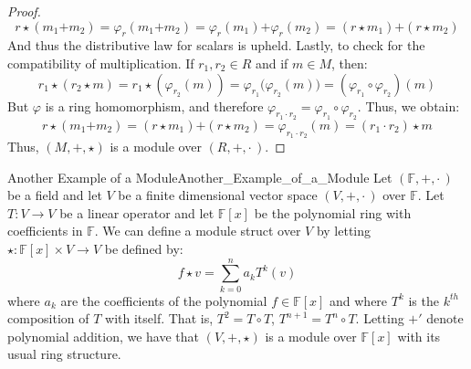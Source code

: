 \begin{proof}
\begin{equation}
            r\star(m_{1}\boldsymbol{+}m_{2})
            =\varphi_{r}(m_{1}\boldsymbol{+}m_{2})
            =\varphi_{r}(m_{1})\boldsymbol{+}\varphi_{r}(m_{2})
            =(r\star{m}_{1})\boldsymbol{+}(r\star{m}_{2})
        \end{equation}
        And thus the distributive law for scalars is upheld. Lastly, to check
        for the compatibility of multiplication. If $r_{1},r_{2}\in{R}$ and if
        $m\in{M}$, then:
        \begin{equation}
            r_{1}\star(r_{2}\star{m})
            =r_{1}\star(\varphi_{r_{2}}(m))
            =\varphi_{r_{1}}\big(\varphi_{r_{2}}(m)\big)
            =(\varphi_{r_{1}}\circ\varphi_{r_{2}})(m)
        \end{equation}
        But $\varphi$ is a ring homomorphism, and therefore
        $\varphi_{r_{1}\cdot{r_{2}}}=\varphi_{r_{1}}\circ\varphi_{r_{2}}$.
        Thus, we obtain:
        \begin{equation}
            r\star(m_{1}\boldsymbol{+}m_{2})
            =(r\star{m}_{1})\boldsymbol{+}(r\star{m}_{2})
            =\varphi_{r_{1}\cdot{r_{2}}}(m)
            =(r_{1}\cdot{r}_{2})\star{m}
        \end{equation}
        Thus, $(M,\boldsymbol{+},\star)$ is a module over $(R,+,\cdot\,)$.
    \end{proof}
    \begin{lexample}{Another Example of a Module}{Another_Example_of_a_Module}
        Let $(\mathbb{F},+,\cdot\,)$ be a field and let $V$ be a finite
        dimensional vector space $(V,\boldsymbol{+},\boldsymbol{\cdot}\,)$ over
        $\mathbb{F}$. Let $T:V\rightarrow{V}$ be a linear operator and let
        $\mathbb{F}[x]$ be the polynomial ring with coefficients in
        $\mathbb{F}$. We can define a module struct over $V$ by letting
        $\star:\mathbb{F}[x]\times{V}\rightarrow{V}$ be defined by:
        \begin{equation}
            f\star{v}=\sum_{k=0}^{n}a_{k}T^{k}(v)
        \end{equation}
        where $a_{k}$ are the coefficients of the polynomial $f\in\mathbb{F}[x]$
        and where $T^{k}$ is the $k^{th}$ composition of $T$ with itself. That
        is, $T^{2}=T\circ{T}$, $T^{n+1}=T^{n}\circ{T}$. Letting
        $\boldsymbol{+}'$ denote polynomial addition, we have that
        $(V,\boldsymbol{+},\star)$ is a module over $\mathbb{F}[x]$ with its
        usual ring structure.
    \end{lexample}
